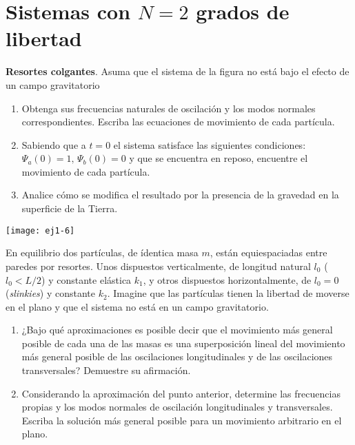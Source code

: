 \section*{Sistemas con \(N= 2\) grados de libertad}

\item
\begin{minipage}[t][5cm]{0.75\textwidth}
\textbf{Resortes colgantes}.
Asuma que el sistema de la figura no está bajo el efecto de un campo gravitatorio
\begin{enumerate}
	\item Obtenga sus frecuencias naturales de oscilación y los modos normales correspondientes.
	Escriba las ecuaciones de movimiento de cada partícula.
	\item Sabiendo que a $t= 0$ el sistema satisface las siguientes condiciones: $\Psi_a(0)= 1, \, \Psi_b(0)= 0$ y que se encuentra en reposo, encuentre el movimiento de cada partícula.
	\item Analice cómo se modifica el resultado por la presencia de la gravedad en la superficie de la Tierra.
\end{enumerate}
\end{minipage}
\begin{minipage}[c][0cm][t]{0.2\textwidth}
  \texttt{[image: ej1-6]}
\end{minipage}



\item
\begin{minipage}[t][3.1cm]{0.6\textwidth}
En equilibrio dos partículas, de ídentica masa $m$, están equiespaciadas entre paredes por resortes. 
Unos dispuestos verticalmente, de longitud natural $l_0$ ($l_0< L/2$) y constante elástica $k_1$, y otros dispuestos horizontalmente, de $l_0= 0$ (\emph{slinkies}) y constante $k_2$.
Imagine que las partículas tienen la libertad de moverse en el plano y que el sistema no está en un campo gravitatorio.
\end{minipage}
\begin{minipage}[c][2.2cm][t]{0.35\textwidth}
\begingroup
	
\endgroup
\end{minipage}
\begin{enumerate}
	\item ¿Bajo qué aproximaciones es posible decir que el movimiento más general posible de cada una de las masas es una superposición lineal del movimiento más general posible de las oscilaciones longitudinales y de las oscilaciones transversales?
	Demuestre su afirmación.
	\item Considerando la aproximación del punto anterior, determine las frecuencias propias y los modos normales de oscilación longitudinales y transversales.
	Escriba la solución más general posible para un movimiento arbitrario en el plano.
\end{enumerate}



